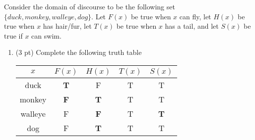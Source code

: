 \begin{questions}
  Consider the domain of discourse to be the following set $ \{ duck, monkey, walleye, dog \}$.  Let $F(x)$ be true when $x$ can fly, let $H(x)$ be true when $x$ has hair/fur, let $T(x)$ be true when $x$ has a tail, and let $S(x)$ be true if $x$ can swim. 

\begin{enumerate}[label=(\alph*)]
  \item (3 pt) Complete the following truth table

\ifprintanswers
  \begin{tabular}{|c|c|c|c|c|}
        \hline
          $x$ & $F(x)$ & $H(x)$ & $T(x)$ & \hspace*{0.15in} $S(x)$ \hspace*{0.15in} \\
        \hline
          duck  & \textbf{T} & F & T & T \\
        \hline
          monkey & \textbf{F} & \textbf{T} & T & T \\
        \hline
           walleye & F & \textbf{F} & T & \textbf{T} \\
        \hline 
           dog   & F & \textbf{T} & T & T \\
        \hline
      \end{tabular}
\else 


\end{enumerate}
\end{questions}
